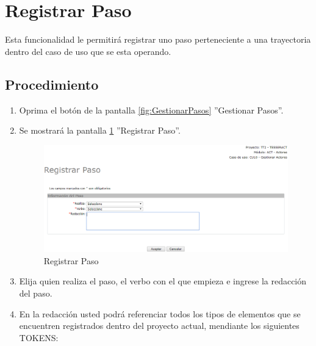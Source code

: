 
\hypertarget{cv:registrarPaso}{\section{Registrar Paso}} \label{sec:registrarPaso}

	Esta funcionalidad le permitirá registrar uno paso perteneciente a una trayectoria dentro del caso de uso que se esta operando.

		\subsection{Procedimiento}

			\begin{enumerate}
	
			\item Oprima el botón \IURegistrar{} de la pantalla \ref{fig:GestionarPasos} ''Gestionar Pasos''.
			
			\item Se mostrará la pantalla \ref{fig:registrarPaso} ''Registrar Paso''.

			\begin{figure}[H]
				\begin{center}
					\includegraphics[scale=0.6]{roles/lider/casosUso/trayectorias/pasos/pantallas/IU6-1-1-1-1registrarPaso}
					\caption{Registrar Paso}
					\label{fig:registrarPaso}
				\end{center}
			\end{figure}
		
			\item Elija quien realiza el paso, el verbo con el que empieza e ingrese la redacción del paso.
			
			\item En la redacción usted podrá referenciar todos los tipos de elementos que se encuentren registrados dentro del proyecto actual, mendiante los siguientes TOKENS:
			

\end{enumerate}
